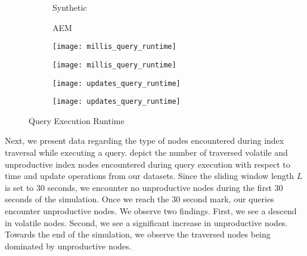 \documentclass[abstracton,12pt]{scrartcl}
\theoremstyle{definition}
\begin{document}
\begin{figure}[h]
  \centering
  \begin{subfigure}{0.49\linewidth}
    \centering
    Synthetic
  \end{subfigure}
  \begin{subfigure}{0.49\linewidth}
    \centering
    AEM
  \end{subfigure}
  \begin{subfigure}{0.49\linewidth}
    \centering
    \texttt{[image: millis\_query\_runtime]}
    \caption{}
    \label{fig:query_runtime_synthetic_millis}
  \end{subfigure}
  \begin{subfigure}{0.49\linewidth}
    \centering
    \texttt{[image: millis\_query\_runtime]}
    \caption{}
    \label{fig:query_runtime_aem_millis}
  \end{subfigure}
  \begin{subfigure}{0.49\linewidth}
    \centering
    \texttt{[image: updates\_query\_runtime]}
    \caption{}
    \label{fig:query_runtime_synthetic_updates}
  \end{subfigure}
  \begin{subfigure}{0.49\linewidth}
    \centering
    \texttt{[image: updates\_query\_runtime]}
    \caption{}
    \label{fig:query_runtime_aem_updates}
  \end{subfigure}
  \caption{Query Execution Runtime}
  \label{fig:query_runtime}
\end{figure}

Next, we present data regarding the type of nodes encountered during index traversal while
executing a query.
 depict
the number of traversed volatile and unproductive index nodes encountered during query
execution with respect to time and update operations from our datasets.
Since the sliding window length $L$ is set to $30$ seconds, we encounter no
unproductive nodes during the first $30$ seconds of the simulation. Once we
reach the $30$ second mark, our queries encounter unproductive nodes. We observe
two findings. First, we see a descend in volatile nodes. Second, we see a
significant increase in unproductive nodes. Towards the end of the simulation,
we observe the traversed nodes being dominated by unproductive nodes. 
\end{document}
